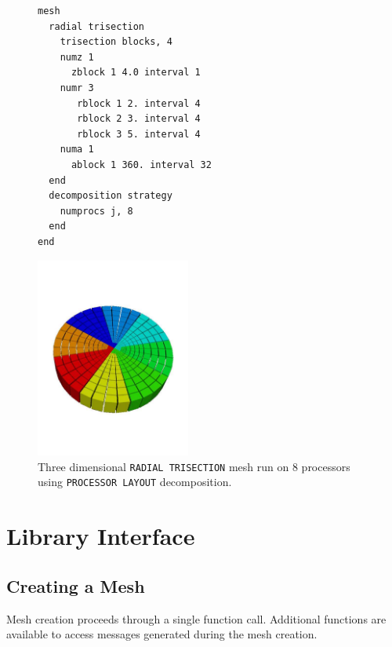 \begin{figure}[htbp]
\centering
  \begin{minipage}[c]{0.4\linewidth}
    \centering
{\ttfamily \begin{verbatim}
mesh
  radial trisection
    trisection blocks, 4
    numz 1
      zblock 1 4.0 interval 1
    numr 3 
       rblock 1 2. interval 4
       rblock 2 3. interval 4
       rblock 3 5. interval 4
    numa 1
      ablock 1 360. interval 32
  end
  decomposition strategy
    numprocs j, 8
  end
end
\end{verbatim}}
  \end{minipage}%
  \hfil
  \begin{minipage}[c]{0.6\linewidth}
    \centering
      \includegraphics[width=2.0in]{trisection_decomp}
  \end{minipage}
  \caption [\texttt{PROCESSOR LAYOUT} decomposition on 8 processors.] {Three dimensional \texttt{RADIAL TRISECTION} mesh run on 8 processors using \texttt{PROCESSOR LAYOUT} decomposition.}
  \label{fig:tri_dec}
\end{figure}


\clearpage
\section{Library Interface}\label{sec:execution_steps}
\subsection{Creating a Mesh}
Mesh creation proceeds through a single function call. Additional functions are available to access messages generated during the mesh creation.
